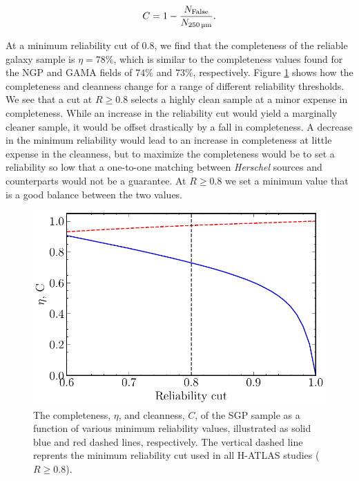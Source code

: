 \begin{equation}
    C = 1 - \frac{N_{\textrm{False}}}{N_{\textrm{250\,\micron}}}.
\label{eq:cleanness}
\end{equation}

At a minimum reliability cut of $0.8$, we find that the completeness of the reliable galaxy sample is $\eta = 78\%$, which is similar to the completeness values found for the NGP and GAMA fields of $74\%$ and $73\%$, respectively. Figure \ref{fig:completeness_and_cleanness} shows how the completeness and cleanness change for a range of different reliability thresholds. We see that a cut at $R \geq 0.8$ selects a highly clean sample at a minor expense in completeness. While an increase in the reliability cut would yield a marginally cleaner sample, it would be offset drastically by a fall in completeness. A decrease in the minimum reliability would lead to an increase in completeness at little expense in the cleanness, but to maximize the completeness would be to set a reliability so low that a one-to-one matching between \textit{Herschel} sources and counterparts would not be a guarantee. At $R \geq 0.8$ we set a minimum value that is a good balance between the two values.

\begin{figure}
    \centering
	\includegraphics[width=0.8\columnwidth]{Figures/completeness_and_cleanness.pdf}
	\caption[Completeness and cleanness of the SGP sample as a function of reliabilty]{The completeness, $\eta$, and cleanness, $C$, of the SGP sample as a function of various minimum reliability values, illustrated as solid blue and red dashed lines, respectively. The vertical dashed line reprents the minimum reliability cut used in all H-ATLAS studies ($R \geq 0.8$).}
	\label{fig:completeness_and_cleanness}
\end{figure}

